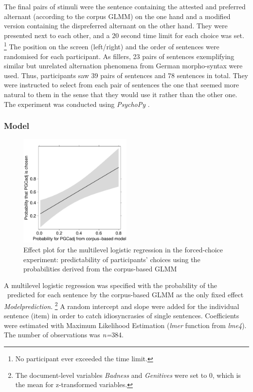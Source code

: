 The final pairs of stimuli were the sentence containing the attested and preferred alternant (according to the corpus GLMM) on the one hand and a modified version containing the dispreferred alternant on the other hand.
They were presented next to each other, and a 20 second time limit for each choice was set.%
\footnote{No participant ever exceeded the time limit.}
The position on the screen (left\slash right) and the order of sentences were randomised for each participant.
As fillers, 23 pairs of sentences exemplifying similar but unrelated alternation phenomena from German morpho-syntax were used.
Thus, participants saw 39 pairs of sentences and 78 sentences in total.
They were instructed to select from each pair of sentences the one that seemed more natural to them in the sense that they would use it rather than the other one.
The experiment was conducted using \textit{PsychoPy} \citep{Peirce2007}.

\subsubsection{Model}

\begin{figure}[htbp!]
\centering
\includegraphics[width=0.5\textwidth]{../R/output/fc_effects}
\caption{Effect plot for the multilevel logistic regression in the forced-choice experiment: predictability of participants' choices using the probabilities derived from the corpus-based GLMM}
\label{fig:afc:effects}
\end{figure}

A multilevel logistic regression was specified with the probability of the \PGCa\ predicted for each sentence by the corpus-based GLMM as the only fixed effect \textit{Modelprediction}.%
\footnote{The document-level variables \textit{Badness} and \textit{Genitives} were set to 0, which is the mean for z-transformed variables.}
A random intercept and slope were added for the individual sentence (item) in order to catch idiosyncrasies of single sentences.
Coefficients were estimated with Maximum Likelihood Estimation (\textit{lmer} function from \textit{lme4}).
The number of observations was \textit{n=}384.

